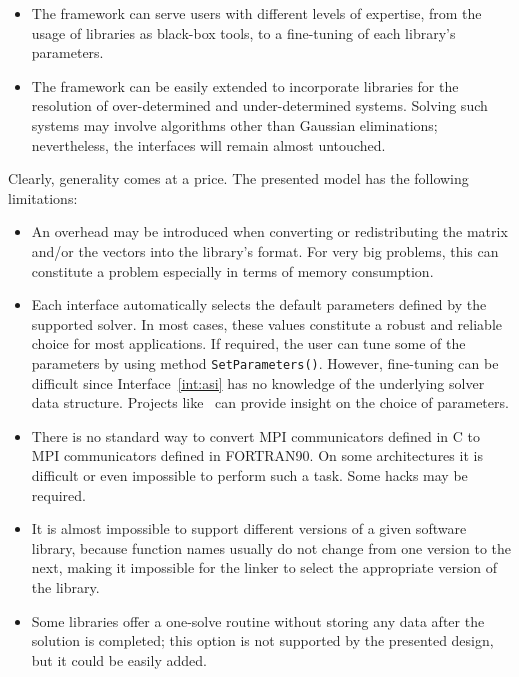 \documentclass[acmtocl]{acmtrans2m}
\begin{document}
\begin{itemize}
\item
The framework can serve users with different levels of expertise, from the
usage of libraries as black-box tools, to a fine-tuning of each library's
parameters.

\item 
The framework can be easily extended to incorporate libraries for the
resolution of over-determined and under-determined systems. Solving such
systems may involve algorithms other than Gaussian eliminations; nevertheless,
the interfaces will remain almost untouched.

\end{itemize}

Clearly, generality comes at a price. The presented model has the following
limitations:
\begin{itemize}
\item
An overhead may be introduced when converting or redistributing the matrix and/or the
vectors into the library's format. For very big problems, this can constitute a
problem especially in terms of memory consumption.
\item 
Each interface automatically selects the default parameters defined by the
supported solver. In most cases, these values constitute a robust and reliable
choice for most applications. If required, the user can tune some of the
parameters by using method \verb!SetParameters()!. However, fine-tuning can be
difficult since Interface~\ref{int:asi} has no knowledge of the underlying
solver data structure. Projects like~\cite{dayde04overview} can provide insight on
the choice of parameters.

\item There
  is no standard way to 
  convert MPI communicators defined in C to MPI communicators defined
  in FORTRAN90. On some architectures it is difficult or even
  impossible to perform such a task. Some hacks may be required.

\item 
It is almost impossible to support different versions of a given software
library, because
function names usually do not change from one version to the
next, making it impossible for the linker to select the
  appropriate version of the library.

%
%
\item
Some libraries offer a one-solve routine without storing any data after the
solution is completed; this option is not  supported
by the presented design, but it could be easily added.


\end{itemize}
\end{document}
